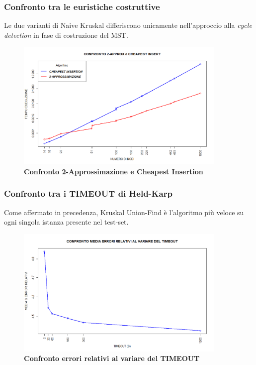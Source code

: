 \documentclass[]{article}
\begin{document}
\begin{flushleft}
\subsubsection{Confronto tra le euristiche costruttive}
Le due varianti di Naive Kruskal differiscono unicamente nell'approccio alla \textit{cycle detection} in fase di costruzione del MST.\\
\begin{figure}[h]
	\centering
	\includegraphics[width=0.9\textwidth,height=\textheight,keepaspectratio]{TEMPO_SU_NODI_2_CHEAP_NEW.png}
	\caption{\textbf{Confronto 2-Approssimazione e Cheapest Insertion}}
	\label{app-cheap}
\end{figure}

\newpage
\subsubsection{Confronto tra i TIMEOUT di Held-Karp}
Come affermato in precedenza, Kruskal Union-Find è l'algoritmo più veloce su ogni singola istanza presente nel test-set.
\begin{figure}[h]
\centering
\includegraphics[width=0.9\textwidth, height=\textheight,keepaspectratio]{CONFRONTO_TIMEOUT_ERRORI.png}
\caption{\textbf{Confronto errori relativi al variare del TIMEOUT}}
\label{TIMEOUT-err}
\end{figure}


\end{flushleft}
\end{document}
